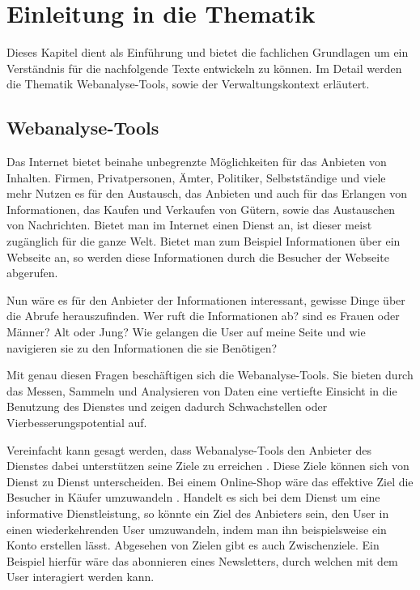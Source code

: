 \section{Einleitung in die Thematik}
Dieses Kapitel dient als Einführung und bietet die fachlichen Grundlagen um ein Verständnis für die nachfolgende Texte entwickeln zu können. Im Detail werden die Thematik Webanalyse-Tools, sowie der Verwaltungskontext erläutert.

\subsection{Webanalyse-Tools}
Das Internet bietet beinahe unbegrenzte Möglichkeiten für das Anbieten von Inhalten. Firmen, Privatpersonen, Ämter, Politiker, Selbstständige und viele mehr Nutzen es für den Austausch, das Anbieten und auch für das Erlangen von Informationen, das Kaufen und Verkaufen von Gütern, sowie das Austauschen von Nachrichten. Bietet man im Internet einen Dienst an, ist dieser meist zugänglich für die ganze Welt. Bietet man zum Beispiel Informationen über ein Webseite an, so werden diese Informationen durch die Besucher der Webseite abgerufen. 

Nun wäre es für den Anbieter der Informationen interessant, gewisse Dinge über die Abrufe herauszufinden. Wer ruft die Informationen ab? sind es Frauen oder Männer? Alt oder Jung? Wie gelangen die User auf meine Seite und wie navigieren sie zu den Informationen die sie Benötigen?

Mit genau diesen Fragen beschäftigen sich die Webanalyse-Tools. Sie bieten durch das Messen, Sammeln und Analysieren von Daten eine vertiefte Einsicht in die Benutzung des Dienstes und zeigen dadurch Schwachstellen oder Vierbesserungspotential auf. 

Vereinfacht kann gesagt werden, dass Webanalyse-Tools den Anbieter des Dienstes dabei unterstützen seine Ziele zu erreichen \parencite[S. 56]{AnalyticsForDummies}. Diese Ziele können sich von Dienst zu Dienst unterscheiden. Bei einem Online-Shop wäre das effektive Ziel die Besucher in Käufer umzuwandeln \parencite[S. 28]{AnalyticsForDummies}. Handelt es sich bei dem Dienst um eine informative Dienstleistung, so könnte ein Ziel des Anbieters sein, den User in einen wiederkehrenden User umzuwandeln, indem man ihn beispielsweise ein Konto erstellen lässt. Abgesehen von Zielen gibt es auch Zwischenziele. Ein Beispiel hierfür wäre das abonnieren eines Newsletters, durch welchen mit dem User interagiert werden kann. 



